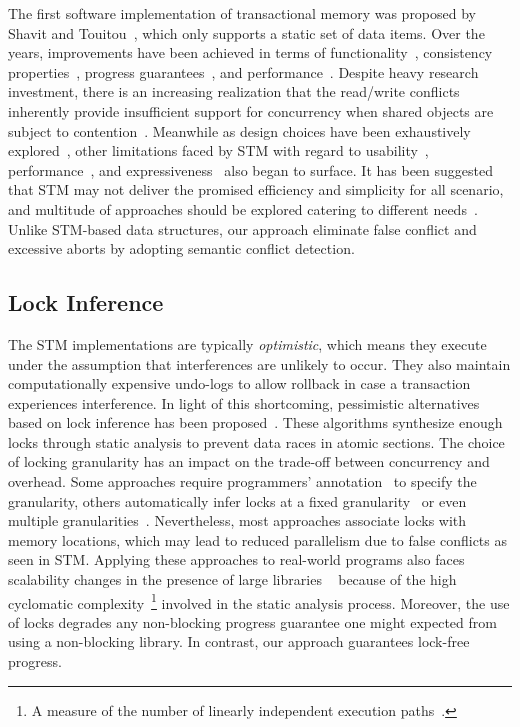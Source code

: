 \documentclass[]{sig-alternate-05-2015}
\begin{document}
The first software implementation of transactional memory was proposed by Shavit and Touitou~\cite{shavit1997software}, which only supports a static set of data items.
Over the years, improvements have been achieved in terms of functionality~\cite{herlihy2003software}, consistency properties~\cite{guerraoui2008correctness}, progress guarantees~\cite{marathe2006lowering}, and performance~\cite{saha2006mcrt,dice2006transactional}. 
Despite heavy research investment, there is an increasing realization that the read/write conflicts inherently provide insufficient support for concurrency when shared objects are subject to contention~\cite{koskinen2010coarse}.
Meanwhile as design choices have been exhaustively explored~\cite{marathe2004qualitative,marathe2004design}, other limitations faced by STM with regard to usability~\cite{Rossbach2010transactional}, performance~\cite{cascaval2008software}, and expressiveness~\cite{guerraoui2008obstruction} also began to surface.
It has been suggested that STM may not deliver the promised efficiency and simplicity for all scenario, and multitude of approaches should be explored catering to different needs~\cite{attiya2010inherent}.
Unlike STM-based data structures, our approach eliminate false conflict and excessive aborts by adopting semantic conflict detection.

\subsection{Lock Inference}
The STM implementations are typically \emph{optimistic}, which means they execute under the assumption that interferences are unlikely to occur.
They also maintain computationally expensive undo-logs to allow rollback in case a transaction experiences interference.
In light of this shortcoming, pessimistic alternatives based on lock inference has been proposed~\cite{mccloskey2006autolocker}.
These algorithms synthesize enough locks through static analysis to prevent data races in atomic sections.
The choice of locking granularity has an impact on the trade-off between concurrency and overhead.
Some approaches require programmers' annotation~\cite{golan2013concurrent} to specify the granularity, others automatically infer locks at a fixed granularity~\cite{emmi2007lock} or even multiple granularities~\cite{cherem2008inferring}.
Nevertheless, most approaches associate locks with memory locations, which may lead to reduced parallelism due to false conflicts as seen in STM. 
Applying these approaches to real-world programs also faces scalability changes in the presence of large libraries ~\cite{gudka2012lock} because of the high cyclomatic complexity~\footnote{A measure of the number of linearly independent execution paths~\cite{mccabe1976complexity}.} involved in the static analysis process.
Moreover, the use of locks degrades any non-blocking progress guarantee one might expected from using a non-blocking library.
In contrast, our approach guarantees lock-free progress.
\end{document}
